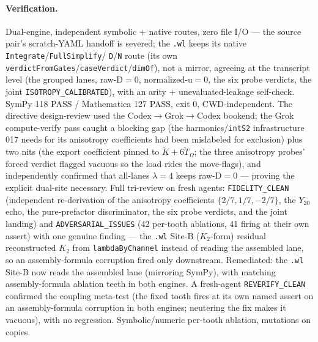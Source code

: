 \paragraph{Verification.}
Dual-engine, independent symbolic + native routes, zero file I/O --- the source pair's scratch-YAML
handoff is severed; the \texttt{.wl} keeps its native \texttt{Integrate}/\texttt{FullSimplify}/
\texttt{D}/\texttt{N} route (its own \texttt{verdictFromGates}/\texttt{caseVerdict}/\texttt{dimOf}),
not a mirror, agreeing at the transcript level (the grouped lanes, raw-D\(=0\), normalized-u\(=0\),
the six probe verdicts, the joint \texttt{ISOTROPY\_CALIBRATED}), with an arity + unevaluated-leakage
self-check. SymPy 118 PASS / Mathematica 127 PASS, exit 0, CWD-independent. The directive design-review
used the Codex\(\to\)Grok\(\to\)Codex bookend; the Grok compute-verify pass caught a blocking gap (the
harmonics/\texttt{intS2} infrastructure 017 needs for its anisotropy coefficients had been mislabeled
for exclusion) plus two nits (the export coefficient pinned to \(\tilde K+6\tilde T_\Omega\); the three
anisotropy probes' forced verdict flagged vacuous so the load rides the move-flags), and independently
confirmed that all-lanes \(\lambda=4\) keeps raw-D\(=0\) --- proving the explicit dual-site necessary.
Full tri-review on fresh agents: \texttt{FIDELITY\_CLEAN} (independent re-derivation of the anisotropy
coefficients \(\{2/7,1/7,-2/7\}\), the \(Y_{20}\) echo, the pure-prefactor discriminator, the six probe
verdicts, and the joint landing) and \texttt{ADVERSARIAL\_ISSUES} (42 per-tooth ablations, 41 firing at
their own assert) with one genuine finding --- the \texttt{.wl} Site-B (\(K_2\)-form) residual
reconstructed \(K_2\) from \texttt{lambdaByChannel} instead of reading the assembled lane, so an
assembly-formula corruption fired only downstream. Remediated: the \texttt{.wl} Site-B now reads the
assembled lane (mirroring SymPy), with matching assembly-formula ablation teeth in both engines. A
fresh-agent \texttt{REVERIFY\_CLEAN} confirmed the coupling meta-test (the fixed tooth fires at its own
named assert on an assembly-formula corruption in both engines; neutering the fix makes it vacuous),
with no regression. Symbolic/numeric per-tooth ablation, mutations on copies.
